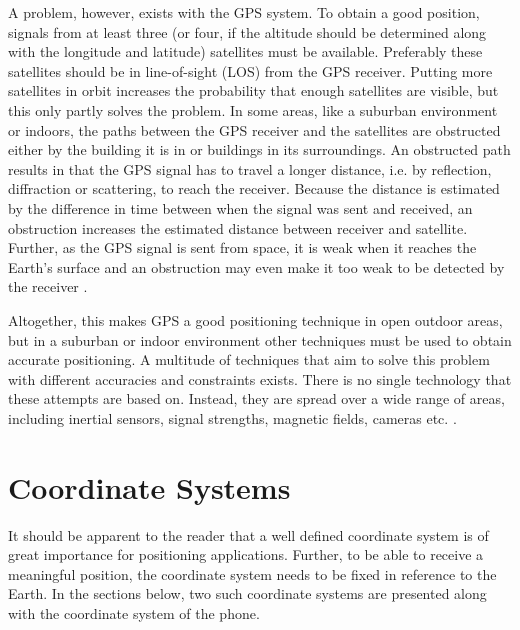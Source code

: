 \documentclass{LTHthesis}
\begin{document}
A problem, however, exists with the GPS system. To obtain a good position, signals from at least three (or four, if the altitude should be determined along with the longitude and latitude) satellites must be available. Preferably these satellites should be in line-of-sight (LOS) from the GPS receiver. Putting more satellites in orbit increases the probability that enough satellites are visible, but this only partly solves the problem. In some areas, like a suburban environment or indoors, the paths between the GPS receiver and the satellites are obstructed either by the building it is in or buildings in its surroundings. An obstructed path results in that the GPS signal has to travel a longer distance, i.e. by reflection, diffraction or scattering, to reach the receiver. Because the distance is estimated by the difference in time between when the signal was sent and received, an obstruction increases the estimated distance between receiver and satellite. Further, as the GPS signal is sent from space, it is weak when it reaches the Earth's surface and an obstruction may even make it too weak to be detected by the receiver \cite{gps_acc}.

Altogether, this makes GPS a good positioning technique in open outdoor areas, but in a suburban or indoor environment other techniques must be used to obtain accurate positioning. A multitude of techniques that aim to solve this problem with different accuracies and constraints exists. There is no single technology that these attempts are based on. Instead, they are spread over a wide range of areas, including inertial sensors, signal strengths, magnetic fields, cameras etc. \cite{positioning_overview}. 
%
\section{Coordinate Systems}
It should be apparent to the reader that a well defined coordinate system is of great importance for positioning applications. Further, to be able to receive a meaningful position, the coordinate system needs to be fixed in reference to the Earth. In the sections below, two such coordinate systems are presented along with the coordinate system of the phone. 
\end{document}
